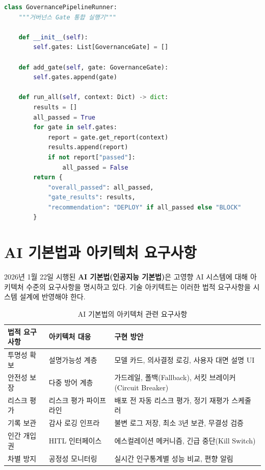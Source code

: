 \begin{lstlisting}[language=Python, caption={자동화 거버넌스 Gate 엔진}, label={lst:governance_automation}]
class GovernancePipelineRunner:
    """거버넌스 Gate 통합 실행기"""

    def __init__(self):
        self.gates: List[GovernanceGate] = []

    def add_gate(self, gate: GovernanceGate):
        self.gates.append(gate)

    def run_all(self, context: Dict) -> dict:
        results = []
        all_passed = True
        for gate in self.gates:
            report = gate.get_report(context)
            results.append(report)
            if not report["passed"]:
                all_passed = False
        return {
            "overall_passed": all_passed,
            "gate_results": results,
            "recommendation": "DEPLOY" if all_passed else "BLOCK"
        }
\end{lstlisting}

\section{AI 기본법과 아키텍처 요구사항}
\label{sec:13.8}

2026년 1월 22일 시행된 \textbf{AI 기본법(인공지능 기본법)}은 고영향 AI 시스템에 대해 아키텍처 수준의 요구사항을 명시하고 있다. 기술 아키텍트는 이러한 법적 요구사항을 시스템 설계에 반영해야 한다.

\begin{table}[htbp]
\centering
\caption{AI 기본법의 아키텍처 관련 요구사항}
\label{tab:ai_basic_act_architecture}
\begin{tabularx}{\textwidth}{p{3cm}p{3.5cm}X}
\toprule
\textbf{법적 요구사항} & \textbf{아키텍처 대응} & \textbf{구현 방안} \\
\midrule
투명성 확보 & 설명가능성 계층 & 모델 카드, 의사결정 로깅, 사용자 대면 설명 UI \\
\midrule
안전성 보장 & 다중 방어 계층 & 가드레일, 폴백(Fallback), 서킷 브레이커(Circuit Breaker) \\
\midrule
리스크 평가 & 리스크 평가 파이프라인 & 배포 전 자동 리스크 평가, 정기 재평가 스케줄러 \\
\midrule
기록 보관 & 감사 로깅 인프라 & 불변 로그 저장, 최소 3년 보관, 무결성 검증 \\
\midrule
인간 개입권 & HITL 인터페이스 & 에스컬레이션 메커니즘, 긴급 중단(Kill Switch) \\
\midrule
차별 방지 & 공정성 모니터링 & 실시간 인구통계별 성능 비교, 편향 알림 \\
\bottomrule
\end{tabularx}
\end{table}


